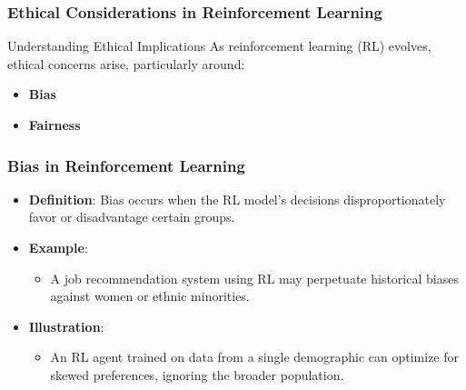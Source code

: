 \documentclass{beamer}
\begin{document}
\begin{frame}[fragile]
    \frametitle{Ethical Considerations in Reinforcement Learning}
    \begin{block}{Understanding Ethical Implications}
        As reinforcement learning (RL) evolves, ethical concerns arise, particularly around:
        \begin{itemize}
            \item \textbf{Bias}
            \item \textbf{Fairness}
        \end{itemize}
    \end{block}
\end{frame}

\begin{frame}[fragile]
    \frametitle{Bias in Reinforcement Learning}
    \begin{itemize}
        \item \textbf{Definition}: Bias occurs when the RL model's decisions disproportionately favor or disadvantage certain groups.
        \item \textbf{Example}: 
            \begin{itemize}
                \item A job recommendation system using RL may perpetuate historical biases against women or ethnic minorities.
            \end{itemize}
        \item \textbf{Illustration}: 
            \begin{itemize}
                \item An RL agent trained on data from a single demographic can optimize for skewed preferences, ignoring the broader population.
            \end{itemize}
    \end{itemize}
\end{frame}
\end{document}
